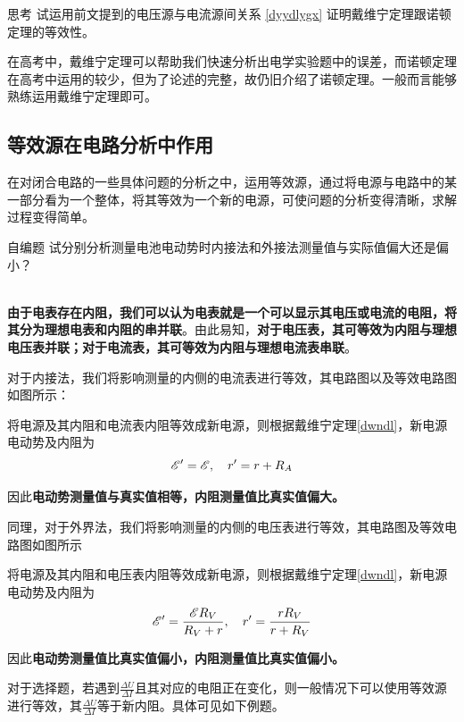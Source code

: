 \begin{mk}{思考}{}
试运用前文提到的电压源与电流源间关系 \eqref{dyydlygx} 证明戴维宁定理跟诺顿定理的等效性。
\end{mk}

在高考中，戴维宁定理可以帮助我们快速分析出电学实验题中的误差，而诺顿定理在高考中运用的较少，但为了论述的完整，故仍旧介绍了诺顿定理。一般而言能够熟练运用戴维宁定理即可。

\subsection{等效源在电路分析中作用}

在对闭合电路的一些具体问题的分析之中，运用等效源，通过将电源与电路中的某一部分看为一个整体，将其等效为一个新的电源，可使问题的分析变得清晰，求解过程变得简单。

\begin{ep}{自编题}{}
试分别分析测量电池电动势时内接法和外接法测量值与实际值偏大还是偏小？

~\\
\textbf{由于电表存在内阻，我们可以认为电表就是一个可以显示其电压或电流的电阻，将其分为理想电表和内阻的串并联}。由此易知，\textbf{对于电压表，其可等效为内阻与理想电压表并联；对于电流表，其可等效为内阻与理想电流表串联}。

对于内接法，我们将影响测量的内侧的电流表进行等效，其电路图以及等效电路图如图所示：



将电源及其内阻和电流表内阻等效成新电源，则根据戴维宁定理\eqref{dwndl}，新电源电动势及内阻为
$$ \mathscr{E}^{\prime} = \mathscr{E} ,\quad r^{\prime} = r + R_A $$

因此\textbf{电动势测量值与真实值相等，内阻测量值比真实值偏大。}

同理，对于外界法，我们将影响测量的内侧的电压表进行等效，其电路图及等效电路图如图所示



将电源及其内阻和电压表内阻等效成新电源，则根据戴维宁定理\eqref{dwndl}，新电源电动势及内阻为
$$ \mathscr{E}^{\prime} = \frac{ \mathscr{E} R_V}{R_V + r} ,\quad r^{\prime} = \frac{r R_V}{r + R_V} $$

因此\textbf{电动势测量值比真实值偏小，内阻测量值比真实值偏小。}
\end{ep}

对于选择题，若遇到$\frac{\Delta U}{\Delta I}$且其对应的电阻正在变化，则一般情况下可以使用等效源进行等效，其$\frac{\Delta U}{\Delta I}$等于新内阻。具体可见如下例题。

